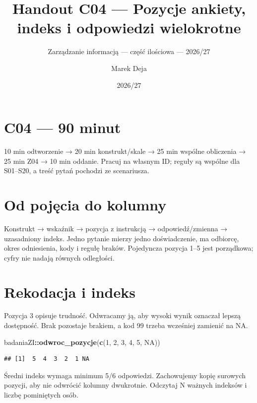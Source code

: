 \documentclass[
  polish,
  11pt,
  a4paper,
]{article}
\title{Handout C04 --- Pozycje ankiety, indeks i odpowiedzi wielokrotne}
\subtitle{Zarządzanie informacją --- część ilościowa --- 2026/27}
\author{Marek Deja}
\date{2026/27}
\newenvironment{Shaded}{\begin{snugshade}}{\end{snugshade}}
\newcommand{\ConstantTok}[1]{\textcolor[rgb]{0.56,0.35,0.01}{#1}}
\newcommand{\DecValTok}[1]{\textcolor[rgb]{0.00,0.00,0.81}{#1}}
\newcommand{\FunctionTok}[1]{\textcolor[rgb]{0.13,0.29,0.53}{\textbf{#1}}}
\newcommand{\NormalTok}[1]{#1}
\newcommand{\SpecialCharTok}[1]{\textcolor[rgb]{0.81,0.36,0.00}{\textbf{#1}}}
\begin{document}
\maketitle

\section{C04 --- 90 minut}\label{c04-90-minut}

10 min odtworzenie → 20 min konstrukt/skale → 25 min wspólne obliczenia
→ 25 min Z04 → 10 min oddanie. Pracuj na własnym ID; reguły są wspólne
dla S01--S20, a treść pytań pochodzi ze scenariusza.

\section{Od pojęcia do kolumny}\label{od-pojux119cia-do-kolumny}

Konstrukt → wskaźnik → pozycja z instrukcją → odpowiedź/zmienna →
uzasadniony indeks. Jedno pytanie mierzy jedno doświadczenie, ma
odbiorcę, okres odniesienia, kody i regułę braków. Pojedyncza pozycja
1--5 jest porządkowa; cyfry nie nadają równych odległości.

\section{Rekodacja i indeks}\label{rekodacja-i-indeks}

Pozycja 3 opisuje trudność. Odwracamy ją, aby wysoki wynik oznaczał
lepszą dostępność. Brak pozostaje brakiem, a kod 99 trzeba wcześniej
zamienić na NA.

\begin{Shaded}
\begin{Highlighting}[]
\NormalTok{badaniaZI}\SpecialCharTok{::}\FunctionTok{odwroc\_pozycje}\NormalTok{(}\FunctionTok{c}\NormalTok{(}\DecValTok{1}\NormalTok{, }\DecValTok{2}\NormalTok{, }\DecValTok{3}\NormalTok{, }\DecValTok{4}\NormalTok{, }\DecValTok{5}\NormalTok{, }\ConstantTok{NA}\NormalTok{))}
\end{Highlighting}
\end{Shaded}

\begin{verbatim}
## [1]  5  4  3  2  1 NA
\end{verbatim}

Średni indeks wymaga minimum 5/6 odpowiedzi. Zachowujemy kopię surowych
pozycji, aby nie odwrócić kolumny dwukrotnie. Odczytaj N ważnych
indeksów i liczbę pominiętych osób.
\end{document}
